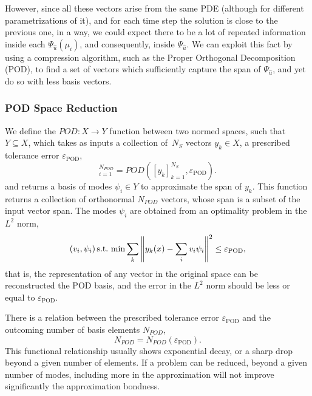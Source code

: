 \documentclass[../../thesis.tex]{subfiles}
\newcommand{\epspod}{\ensuremath{\varepsilon_\text{POD}}}
\begin{document}
However, since all these vectors arise from the same PDE (although for different parametrizations of it), and for each time step the solution is close to the previous one, in a way, we could expect there to be a lot of repeated information inside each $\Psi_{\hat{u}}(\mu_i)$, and consequently, inside $\Psi_{\hat{u}}$.
We can exploit this fact by using a compression algorithm, such as the Proper Orthogonal Decomposition (POD), to find a set of vectors which sufficiently capture the span of $\Psi_{\hat{u}}$, and yet do so with less basis vectors. 


\subsubsection{POD Space Reduction}
\label{sec:1d_rom_burgers_basis_construction_pod}
We define the $POD: X \rightarrow Y$ function between two normed spaces, 
such that $Y \subseteq  X$, 
which takes as inputs a collection of~$N_S$ vectors $y_k \in X$,
a prescribed tolerance error $\epspod$,
\begin{equation}
    [\psi_i]_{i=1}^{N_{POD}} = POD\left([y_k]_{k=1}^{N_S}, \epspod\right).
\end{equation}
and returns a basis of modes $\psi_i \in Y$ to approximate the span of $y_k$.
This function returns a collection of orthonormal $N_{POD}$ vectors, whose span is a subset of the input vector span.
The modes $\psi_i$ are obtained from an optimality problem in the $L^2$ norm,
\begin{equation}
    (v_i, \psi_i) \, \text{s.t.} \, \min \sum_k \norm{y_k(x) - \sum_i v_i \psi_i}^2 \leq \epspod,
\end{equation}
that is, the representation of any vector in the original space can be reconstructed the POD basis, 
and the error in the $L^2$ norm should be less or equal to \epspod.

There is a relation between the prescribed tolerance error $\epspod$ and the outcoming number of basis elements $N_{POD}$, 
\begin{equation}
    N_{POD} = N_{POD}(\epspod).
\end{equation}
This functional relationship usually shows exponential decay, or a sharp drop beyond a given number of elements.
If a problem can be reduced, beyond a given number of modes, including more in the approximation will not improve significantly the approximation bondness.
\end{document}
